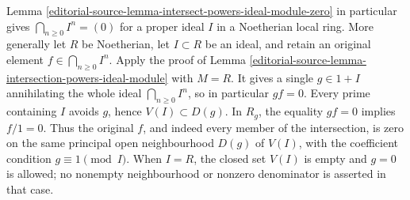 \begin{remark}
\label{editorial-source-remark-intersection-powers-ideal}
Lemma \ref{editorial-source-lemma-intersect-powers-ideal-module-zero} in particular
gives $\bigcap_{n\geq0}I^n=(0)$ for a proper ideal $I$ in a
Noetherian local ring. More generally let $R$ be Noetherian,
let $I\subset R$ be an ideal, and retain an original element
$f\in\bigcap_{n\geq0}I^n$. Apply the proof of
Lemma \ref{editorial-source-lemma-intersection-powers-ideal-module} with $M=R$.
It gives a single $g\in1+I$ annihilating the whole ideal
$\bigcap_{n\geq0}I^n$, so in particular $gf=0$.
Every prime containing $I$ avoids $g$, hence
$V(I)\subset D(g)$. In $R_g$, the equality $gf=0$ implies
$f/1=0$. Thus the original $f$, and indeed every member of the
intersection, is zero on the same principal open neighbourhood
$D(g)$ of $V(I)$, with the coefficient condition $g\equiv1\pmod I$.
When $I=R$, the closed set $V(I)$ is empty and $g=0$ is
allowed; no nonempty neighbourhood or nonzero denominator is
asserted in that case.
\end{remark}